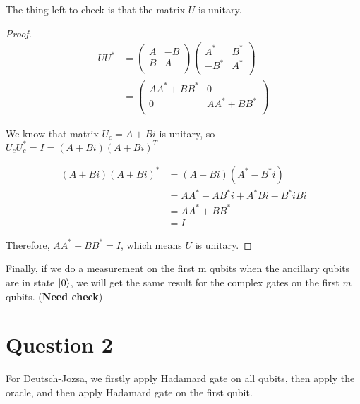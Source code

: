 \documentclass{article}
\theoremstyle{definition}
\DeclarePairedDelimiter\ket{\lvert}{\rangle}
\begin{document}
The thing left to check is that the matrix $U$ is unitary.

\begin{proof}
  \begin{align*}
    U U^{*} & =
    \begin{pmatrix}
      A & -B \\
      B & A  \\
    \end{pmatrix}
    \begin{pmatrix}
      A^*  & B^* \\
      -B^* & A^* \\
    \end{pmatrix}                           \\
            & = \begin{pmatrix}
                  A A^* + B B^* & 0            \\
                  0             & A A^* + BB^* \\
                \end{pmatrix}
  \end{align*}

  We know that matrix $U_c=A+Bi$ is unitary,
  so $U_c U_c^*=I=(A+Bi)(A+Bi)^T$

  \[
    \begin{aligned}
      (A+Bi)(A+Bi)^* & = (A+Bi)(A^*-B^*i)               \\
                     & = AA^* - AB^*i +A^* Bi - B^*i Bi \\
                     & = AA^* + BB^*                    \\
                     & = I
    \end{aligned}
  \]

  Therefore, $A A^* + B B^* = I$, which means $U$ is unitary.
\end{proof}

Finally, if we do a measurement on the first m qubits when the
ancillary qubits are in state $\ket{0}$, we will get the same result
for the complex gates on the first $m$ qubits. (\textbf{Need check})

\pagebreak

\section{Question 2}

For Deutsch-Jozsa, we firstly apply Hadamard gate on all qubits,
then apply the oracle,
and then apply Hadamard gate on the first qubit.
\end{document}
